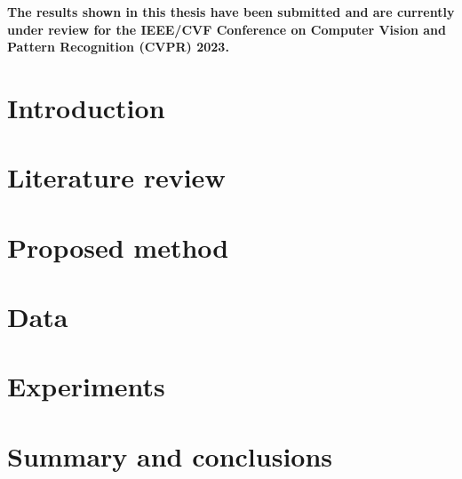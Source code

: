 \documentclass[12pt, oneside, a4paper]{book}
\begin{document}


{   
    \noindent
    \textbf{The results shown in this thesis have been submitted and are currently under review for the IEEE/CVF Conference on Computer Vision and Pattern Recognition (CVPR) 2023.}

}


\cleardoublepage
{}

{
    \hypersetup{linkcolor=black}
    \tableofcontents
    \cleardoublepage
    \listoftables
    \cleardoublepage
    \listoffigures
    \cleardoublepage
}

\chapter{Introduction}
\label{sec:introduction}


\chapter{Literature review}
\label{sec:literature_review}


\chapter{Proposed method}
\label{sec:methods}


\chapter{Data}
\label{sec:data}


\chapter{Experiments}
\label{sec:experiments}


\chapter{Summary and conclusions}
\label{sec:conclusions}


\cleardoublepage
{\small


}
\end{document}

